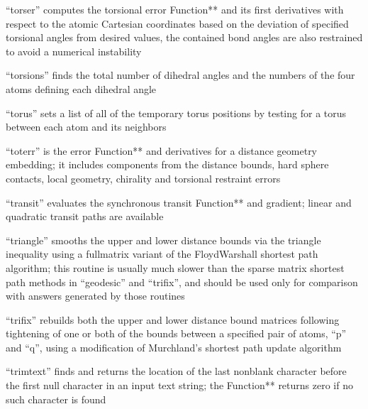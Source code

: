 \documentclass[letterpaper,11pt,english]{sphinxmanual}
\begin{document}

“torser” computes the torsional error Function** and its first derivatives with respect to the atomic Cartesian coordinates based on the deviation of specified torsional angles from desired values, the contained bond angles are also restrained to avoid a numerical instability


“torsions” finds the total number of dihedral angles and the numbers of the four atoms defining each dihedral angle


“torus” sets a list of all of the temporary torus positions by testing for a torus between each atom and its neighbors


“toterr” is the error Function** and derivatives for a distance geometry embedding; it includes components from the distance bounds, hard sphere contacts, local geometry, chirality and torsional restraint errors


“transit” evaluates the synchronous transit Function** and gradient; linear and quadratic transit paths are available


“triangle” smooths the upper and lower distance bounds via the triangle inequality using a full\sphinxhyphen{}matrix variant of the Floyd\sphinxhyphen{}Warshall shortest path algorithm; this routine is usually much slower than the sparse matrix shortest path methods in “geodesic” and “trifix”, and should be used only for comparison with answers generated by those routines


“trifix” rebuilds both the upper and lower distance bound matrices following tightening of one or both of the bounds between a specified pair of atoms, “p” and “q”, using a modification of Murchland’s shortest path update algorithm


“trimtext” finds and returns the location of the last non\sphinxhyphen{}blank character before the first null character in an input text string; the Function** returns zero if no such character is found
\end{document}

